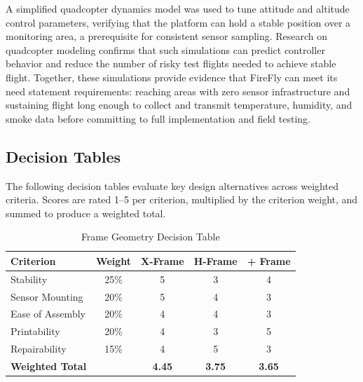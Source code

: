 \documentclass[journal, onecolumn]{IEEEtran}
\begin{document}
\vspace{0.5em}

A simplified quadcopter dynamics model was used to tune attitude and altitude control parameters, verifying that the platform can hold a stable position over a monitoring area, a prerequisite for consistent sensor sampling. Research on quadcopter modeling confirms that such simulations can predict controller behavior and reduce the number of risky test flights needed to achieve stable flight. Together, these simulations provide evidence that FireFly can meet its need statement requirements: reaching areas with zero sensor infrastructure and sustaining flight long enough to collect and transmit temperature, humidity, and smoke data before committing to full implementation and field testing.


\vspace{0.5em}




\subsection{Decision Tables}

The following decision tables evaluate key design alternatives across weighted criteria. Scores are rated 1--5 per criterion, multiplied by the criterion weight, and summed to produce a weighted total.

\begin{table}[H]
\centering
\small
\begin{tabular}{|l|c|c|c|c|}
\hline
\textbf{Criterion} & \textbf{Weight} & \textbf{X-Frame} & \textbf{H-Frame} & \textbf{+ Frame} \\
\hline
Stability & 25\% & 5 & 3 & 4 \\
\hline
Sensor Mounting & 20\% & 5 & 4 & 3 \\
\hline
Ease of Assembly & 20\% & 4 & 4 & 3 \\
\hline
Printability & 20\% & 4 & 3 & 5 \\
\hline
Repairability & 15\% & 4 & 5 & 3 \\
\hline
\textbf{Weighted Total} & & \textbf{4.45} & \textbf{3.75} & \textbf{3.65} \\
\hline
\end{tabular}
\caption{Frame Geometry Decision Table}
\end{table}
\end{document}
